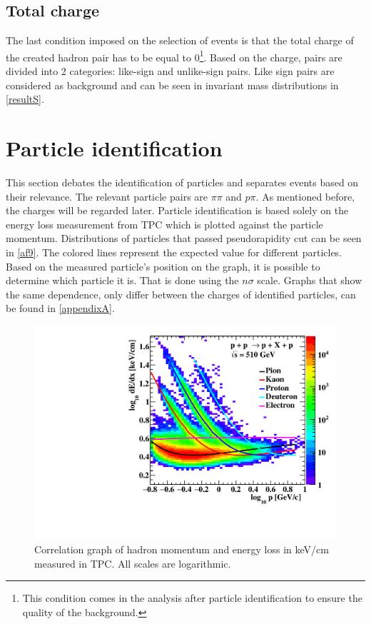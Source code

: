 \subsection{Total charge}
The last condition imposed on the selection of events is that the total charge of the created hadron pair has to be equal to 0\footnote{This condition comes in the analysis after particle identification to ensure the quality of the background.}. Based on the charge, pairs are divided into 2 categories: like-sign and unlike-sign pairs. Like sign pairs are considered as background and can be seen in invariant mass distributions in \autoref{resultS}.

\section{Particle identification}
This section debates the identification of particles and separates events based on their relevance. The relevant particle pairs are $\pi \pi$ and $p \pi$. As mentioned before, the charges will be regarded later.
\newline
Particle identification is based solely on the energy loss measurement from TPC which is plotted against the particle momentum. Distributions of particles that passed pseudorapidity cut can be seen in \autoref{af9}. The colored lines represent the expected value for different particles. Based on the measured particle's position on the graph, it is possible to determine which particle it is. That is done using the $n \sigma$ scale. Graphs that show the same dependence, only differ between the charges of identified particles, can be found in \autoref{appendixA}.
\FloatBarrier
\begin{figure}[ht]
    \centering
    \includegraphics[width=1\textwidth]{figures/dEdx.pdf}
    \caption[Graph of hadron momentum and energy loss from TPC]{Correlation graph of hadron momentum and energy loss in keV/cm measured in TPC. All scales are logarithmic. }
    \label{af9}
\end{figure}
